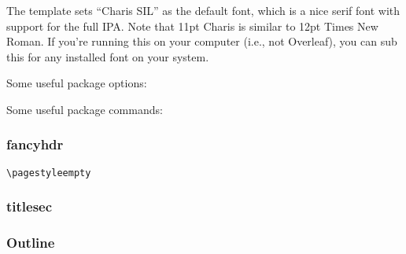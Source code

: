 \documentclass{article}
\begin{document}
    The template sets ``Charis SIL'' as the default font, which is a nice serif font with support for the full IPA. Note that 11pt Charis is similar to 12pt Times New Roman. If you're running this on your computer (i.e., not Overleaf), you can sub this for any installed font on your system. 

    Some useful package options:

    Some useful package commands:

\subsubsection{fancyhdr}

    \texttt{\textbackslash pagestyle{empty}}

\subsubsection{titlesec}

\subsubsection{Outline}

\end{document}
